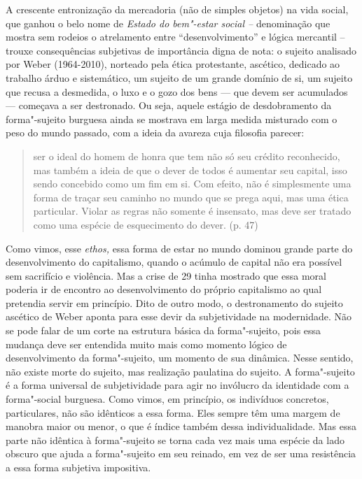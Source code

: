 {A crescente entronização da mercadoria (não de simples objetos) na vida
social, que ganhou o belo nome de \emph{Estado do bem"-estar social --}
denominação que mostra sem rodeios o atrelamento entre
``desenvolvimento'' e lógica mercantil -- trouxe consequências
subjetivas de importância digna de nota: o sujeito analisado por Weber
(1964-2010), norteado pela ética protestante, ascético, dedicado ao
trabalho árduo e sistemático, um sujeito de um grande domínio de si, um
sujeito que recusa a desmedida, o luxo e o gozo dos bens --- que devem
ser acumulados --- começava a ser destronado. Ou seja, aquele estágio de
desdobramento da forma"-sujeito burguesa ainda se mostrava em larga
medida misturado com o peso do mundo passado, com a ideia da avareza
cuja filosofia parecer:

\begin{quote}
ser o ideal do homem de honra que tem não só seu crédito reconhecido,
mas também a ideia de que o dever de todos é aumentar seu capital, isso
sendo concebido como um fim em si. Com efeito, não é simplesmente uma
forma de traçar seu caminho no mundo que se prega aqui, mas uma ética
particular. Violar as regras não somente é insensato, mas deve ser
tratado como uma espécie de esquecimento do dever. (p. 47)
\end{quote}

Como vimos, esse \emph{ethos,} essa forma de estar no mundo dominou
grande parte do desenvolvimento do capitalismo, quando o acúmulo de
capital não era possível sem sacrifício e violência. Mas a crise de 29
tinha mostrado que essa moral poderia ir de encontro ao desenvolvimento
do próprio capitalismo ao qual pretendia servir em princípio. Dito de
outro modo, o destronamento do sujeito ascético de Weber aponta para
esse devir da subjetividade na modernidade. Não se pode falar de um
corte na estrutura básica da forma"-sujeito, pois essa mudança deve ser
entendida muito mais como momento lógico de desenvolvimento da
forma"-sujeito, um momento de sua dinâmica. Nesse sentido, não existe
morte do sujeito, mas realização paulatina do sujeito. A forma"-sujeito é
a forma universal de subjetividade para agir no invólucro da identidade
com a forma"-social burguesa. Como vimos, em princípio, os indivíduos
concretos, particulares, não são idênticos a essa forma. Eles sempre têm
uma margem de manobra maior ou menor, o que é índice também dessa
individualidade. Mas essa parte não idêntica à forma"-sujeito se torna
cada vez mais uma espécie da lado obscuro que ajuda a forma"-sujeito em
seu reinado, em vez de ser uma resistência a essa forma subjetiva
impositiva.

}

